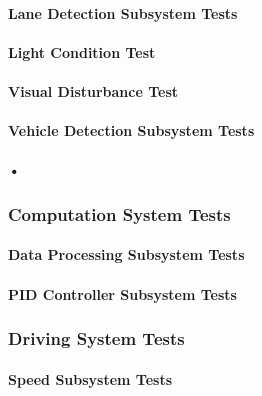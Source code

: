 \documentclass[a4paper,12pt]{article}
\begin{document}
		

	\paragraph{Lane Detection Subsystem Tests}	
	
		\paragraph{Light Condition Test}
		
		\paragraph{Visual Disturbance Test}
		
		\paragraph{}
	 
	 
	\paragraph{Vehicle Detection Subsystem Tests}
	
		\paragraph{•}
	\subsubsection{Computation System Tests}
	
	\paragraph{Data Processing Subsystem Tests}	
		
	\paragraph{PID Controller Subsystem Tests}
	
	
	\subsubsection{Driving System Tests}
	
	\paragraph{Speed Subsystem Tests}	
		
\end{document}
